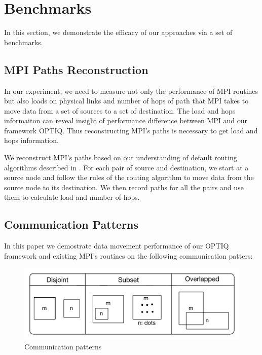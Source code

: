 \section{Benchmarks}
\label{sec:benchmark}

In this section, we demonstrate the efficacy of our approaches via a set of benchmarks.

\subsection{MPI Paths Reconstruction}

In our experiment, we need to measure not only the performance of MPI routines but also loads on physical links and number of hops of path that MPI takes to move data from a set of sources to a set of destination. The load and hops informaiton can reveal insight of performance difference between MPI and our framework OPTIQ. Thus reconstructing MPI's paths is necessary to get load and hops information.

We reconstruct MPI's paths based on our understanding of default routing algorithms described in \cite{Chen:BGQ}. For each pair of source and destination, we start at a source node and follow the rules of the routing algorithm to move data from the source node to its destination. We then record paths for all the pairs and use them to calculate load and number of hops. 

\subsection{Communication Patterns}
In this paper we demostrate data movement performance of our OPTIQ framework and existing MPI's routines on the following communication patters:

\begin{figure}[!htb]
\vspace{-0.1in}
\centering
\includegraphics[scale=0.55]{figures/patterns.pdf}
\vspace{-0.1in}
\caption{Communication patterns}
\vspace{-0.1in}
\label{fig:patterns}
\end{figure}

